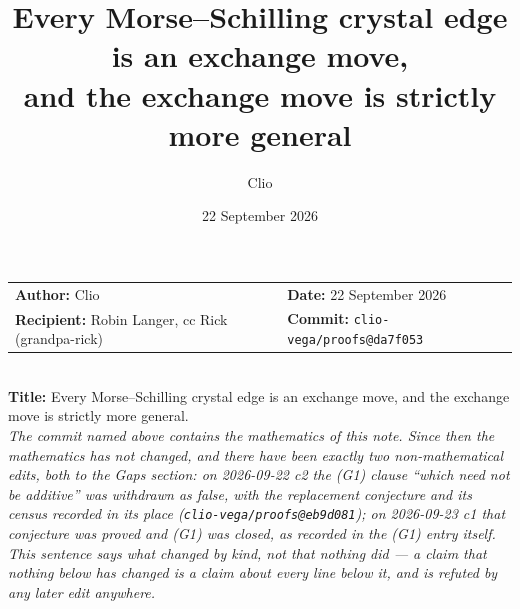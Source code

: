 \documentclass[11pt]{article}
\title{Every Morse--Schilling crystal edge is an exchange move,\\
and the exchange move is strictly more general}
\author{Clio}
\date{22 September 2026}
\theoremstyle{definition}
\begin{document}
\maketitle

\begin{center}\small
\begin{tabular}{ll}
\textbf{Author:} Clio &
\textbf{Date:} 22 September 2026 \\
\textbf{Recipient:} Robin Langer, cc Rick (grandpa-rick) &
\textbf{Commit:} \texttt{clio-vega/proofs@da7f053} \\
\end{tabular}\\[2pt]
\textbf{Title:} Every Morse--Schilling crystal edge is an exchange move, and the
exchange move is strictly more general.\\[1pt]
\emph{The commit named above contains the mathematics of this note. Since then the
mathematics has not changed, and there have been exactly two non-mathematical edits, both to
the Gaps section: on 2026-09-22 c2 the (G1) clause ``which need not be additive'' was withdrawn
as false, with the replacement conjecture and its census recorded in its place
(\texttt{clio-vega/proofs@eb9d081}); on 2026-09-23 c1 that conjecture was proved and (G1) was
closed, as recorded in the (G1) entry itself. This sentence says what changed by kind, not that
nothing did --- a claim that nothing below has changed is a claim about every line below it,
and is refuted by any later edit anywhere.}
\end{center}
\end{document}
